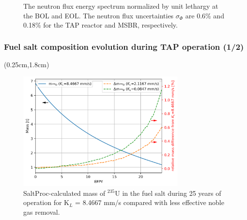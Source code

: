\begin{frame}
\begin{textblock*}{12.6cm}
\begin{figure}[htp!]
\begin{overprint}
		\end{overprint}
			\vspace{-3mm}
		\caption{The neutron flux energy spectrum normalized by unit lethargy 
		at the BOL and EOL. The neutron flux uncertainties $\sigma_{\Phi}$ are 
		0.6\% and 0.18\% for the \gls{TAP} reactor and \gls{MSBR}, 
		respectively.}
	\end{figure}
\end{textblock*}
\end{frame}


\begin{frame}
\frametitle{Fuel salt composition evolution during TAP operation (1/2)}
\begin{textblock*}{12.25cm}(0.25cm,1.8cm) %
	\begin{figure}[htp!] %
		\centering
		\includegraphics[width=0.75\textwidth]{../dissertation/figures/ch4/eps/u235.png}
			\vspace{-2mm}
		\caption{SaltProc-calculated mass of $^{235}$U in the fuel salt during 
		25 years of operation
for K$_L$ = 8.4667 mm/s compared with less 
		effective noble gas removal.}
	\end{figure}
\end{textblock*}
\end{frame}

